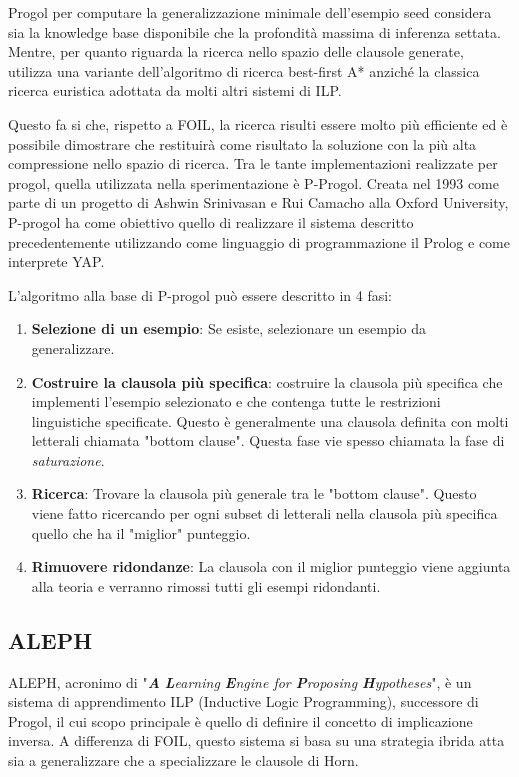 Progol per computare la generalizzazione minimale dell'esempio seed considera sia la knowledge base disponibile che la profondità massima di inferenza settata. Mentre, per quanto riguarda la ricerca nello spazio delle clausole generate, utilizza una variante dell'algoritmo di ricerca best-first A* anziché la classica ricerca euristica adottata da molti altri sistemi di ILP.

Questo fa si che, rispetto a FOIL, la ricerca risulti essere molto più efficiente ed è possibile dimostrare che restituirà come risultato la soluzione con la più alta compressione nello spazio di ricerca.
\nocite{wiki:progol}
Tra le tante implementazioni realizzate per progol, quella utilizzata nella sperimentazione è P-Progol. Creata nel 1993 come parte di un progetto di Ashwin Srinivasan e Rui Camacho alla Oxford University, P-progol ha come obiettivo quello di realizzare il sistema descritto precedentemente utilizzando come linguaggio di programmazione il Prolog e come interprete YAP\cite{pprogol}.

L'algoritmo alla base di P-progol può essere descritto in 4 fasi:

\begin{enumerate}
	\item \textbf{Selezione di un esempio}: Se esiste, selezionare un esempio da generalizzare.
	\item \textbf{Costruire la clausola più specifica}: costruire la clausola più specifica che implementi l'esempio selezionato e che contenga tutte le restrizioni linguistiche specificate. Questo è generalmente una clausola definita con molti letterali chiamata "bottom clause". Questa fase vie spesso chiamata la fase di \emph{saturazione}.
	\item \textbf{Ricerca}: Trovare la clausola più generale tra le "bottom clause". Questo viene fatto ricercando per ogni subset di letterali nella clausola più specifica quello che ha il "miglior" punteggio.
	\item \textbf{Rimuovere ridondanze}: La clausola con il miglior punteggio viene aggiunta alla teoria e verranno rimossi tutti gli esempi ridondanti.
\end{enumerate}

\subsection{ALEPH}
\label{sistemi:aleph}
ALEPH, acronimo di "\emph{\textbf{A} \textbf{L}earning \textbf{E}ngine for \textbf{P}roposing \textbf{H}ypotheses}", è un sistema di apprendimento ILP (Inductive Logic Programming), successore di Progol, il cui scopo principale è quello di definire il concetto di implicazione inversa.
A differenza di FOIL, questo sistema si basa su una strategia ibrida atta sia a generalizzare che a  specializzare le clausole di Horn.

